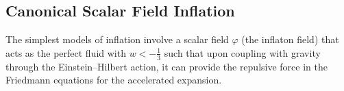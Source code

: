 \documentclass[aps,prd,reprint,preprintnumbers,showpacs,floatfix,nofootinbib,superscript address]{revtex4-2}
\newcommand{\wb}[1]{{\color[RGB]{255,0,0}{\textbf{\textit{[WB: #1]}}}}}
\begin{document}
\subsection{Canonical Scalar Field Inflation} \label{Canonical Scalar Field Inflation}
The simplest models of inflation involve a scalar field $\varphi$ (the inflaton field) that acts as the perfect fluid with $w < -\frac{1}{3}$ such that upon coupling with gravity through the Einstein--Hilbert action, it can provide the repulsive force in the Friedmann equations for the accelerated expansion.

\end{document}
